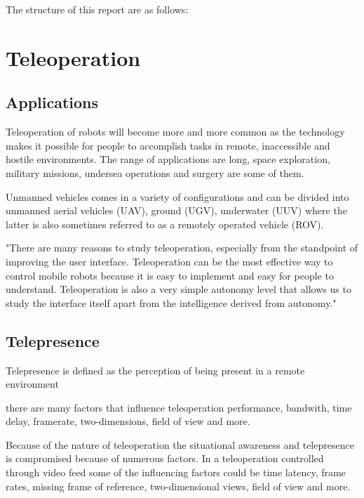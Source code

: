 The structure of this report are as follows: 

\section{Teleoperation}


\subsection{Applications}
Teleoperation of robots will become more and more common as the technology makes it possible for people to accomplish tasks in remote, inaccessible and hostile environments. The range of applications are long, space exploration, military missions, undersea operations and surgery are some of them.

Unmanned vehicles comes in a variety of configurations and can be divided into unmanned aerial vehicles (UAV), ground (UGV), underwater (UUV) where the latter is also sometimes referred to as a remotely operated vehicle (ROV).

\citep{Ricks2004} "There are many reasons to study teleoperation, especially from the standpoint of improving the user interface. Teleoperation can be the most effective way to control mobile robots because it is easy to implement and easy for people to understand. Teleoperation is also a very simple autonomy level that allows us to study the interface itself apart from the intelligence derived from autonomy."


\subsection{Telepresence}

Telepresence is defined as the perception of being present in a remote environment 

there are many factors that influence teleoperation performance, bandwith, time delay, framerate, two-dimensions, field of view and more. \citep{Chen2007}

Because of the nature of teleoperation the situational awareness and telepresence is compromised because of numerous factors. In a teleoperation controlled through video feed some of the influencing factors could be time latency, frame rates, missing frame of reference, two-dimensional views, field of view and more.

